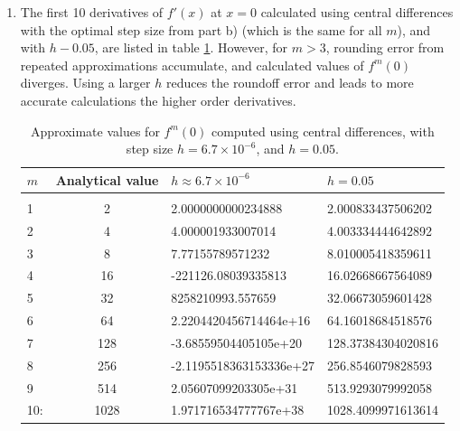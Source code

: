 \documentclass{article}
\begin{document}
\begin{enumerate}
\begin{enumerate}
    \item The first 10 derivatives of $f'(x)$ at $x=0$ calculated using central differences with the optimal step size from part b) (which is the same for all $m$), and with $h-0.05$, are listed in table \ref{tab:1c}.
    However, for $m>3$, rounding error from repeated approximations accumulate, and calculated values of $f^m(0)$ diverges. 
    Using a larger $h$ reduces the roundoff error and leads to more accurate calculations the higher order derivatives.
    \begin{table}[H]
        \centering
        \begin{tabular}{l | c l l}
            $m$ & Analytical value & $h \approx 6.7\times10^{-6}$ & $h=0.05$\\ [0.2 em] \hline  \\[-0.8em] 
            1 & 2 & 2.0000000000234888 & 2.000833437506202\\
            2 & 4& 4.000001933007014 & 4.003334444642892\\
            3 & 8&7.77155789571232 & 8.010005418359611\\
            4 & 16&-221126.08039335813 & 16.02668667564089\\
            5 & 32&8258210993.557659 & 32.06673059601428\\
            6 & 64&2.2204420456714464e+16 & 64.16018684518576\\
            7 & 128&-3.68559504405105e+20 & 128.37384304020816\\
            8 & 256&-2.1195518363153336e+27 & 256.8546079828593\\
            9 & 514&2.05607099203305e+31 & 513.9293079992058\\
            10: & 1028&1.971716534777767e+38 & 1028.4099971613614\\
        \end{tabular}
        \caption{Approximate values for $f^m(0)$ computed using central differences, with step size $h=6.7\times10^{-6}$, and $h=0.05$.}
        \label{tab:1c}
    \end{table}


\end{enumerate}
\end{enumerate}
\end{document}
